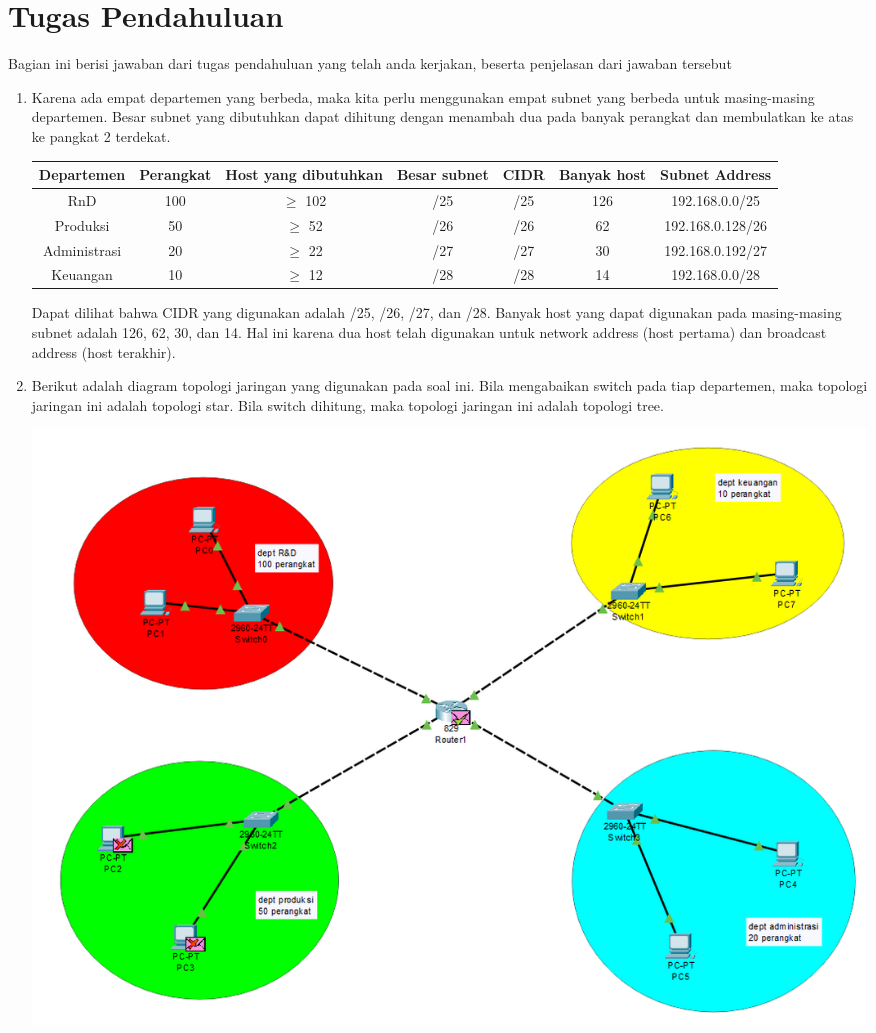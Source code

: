 \section{Tugas Pendahuluan}
Bagian ini berisi jawaban dari tugas pendahuluan yang telah anda kerjakan, beserta penjelasan dari jawaban tersebut
\begin{enumerate}
	\item Karena ada empat departemen yang berbeda, maka kita perlu 
	menggunakan empat subnet yang berbeda untuk masing-masing 
	departemen. Besar subnet yang dibutuhkan dapat dihitung 
	dengan menambah dua pada banyak perangkat dan membulatkan 
	ke atas ke pangkat 2 terdekat.
	{\small
		\begin{center}
		\begin{tabular}{ |c|c|c|c|c|c|c| } 
			\hline
			Departemen & Perangkat & Host yang dibutuhkan & Besar subnet & CIDR & Banyak host & Subnet Address \\
			\hline
			RnD & 100 & $ \geq $ 102 & /25 & /25 & 126 & 192.168.0.0/25 \\
			Produksi & 50 & $ \geq $ 52 & /26 & /26 & 62 & 192.168.0.128/26 \\
			Administrasi & 20 & $ \geq $ 22 & /27 & /27 & 30 & 192.168.0.192/27 \\
			Keuangan & 10 & $ \geq $ 12 & /28 & /28 & 14 & 192.168.0.0/28 \\
			\hline
		\end{tabular}
		\end{center}
	}
	Dapat dilihat bahwa CIDR yang digunakan adalah /25, /26, /27, dan /28.
	Banyak host yang dapat digunakan pada masing-masing subnet adalah 126, 
	62, 30, dan 14. Hal ini karena dua host telah digunakan untuk network 
	address (host pertama) dan broadcast address (host terakhir).
	\item Berikut adalah diagram topologi jaringan yang digunakan 
	pada soal ini. Bila mengabaikan switch pada tiap departemen, 
	maka topologi jaringan ini adalah topologi star. Bila switch 
	dihitung, maka topologi jaringan ini adalah topologi tree.
	\begin{center}
		\includegraphics[scale=0.5]{P1/img/topology.png}

\end{center}
\end{enumerate}
